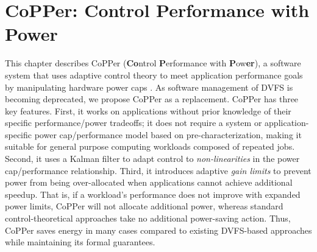 \chapter{CoPPer: Control Performance with Power}
\label{sec:copper}

This chapter describes CoPPer (\textbf{Co}ntrol \textbf{P}erf\-ormance with \textbf{P}ow\textbf{er}), a software system that uses adaptive control theory to meet application performance goals by manipulating hardware power caps \cite{CopperTR}.
As software management of DVFS is becoming deprecated, we propose CoPPer as a replacement.
CoPPer has three key features.
First, it works on applications without prior knowledge of their specific performance/power tradeoffs; \ie it does not require a system or application-specific power cap/performance model based on pre-characterization, making it suitable for general purpose computing workloads composed of repeated jobs.
Second, it uses a Kalman filter to adapt control to \emph{non-linearities} in the power cap/performance relationship.
Third, it introduces adaptive \emph{gain limits} to prevent power from being over-allocated when applications cannot achieve additional speedup.
That is, if a workload's performance does not improve with expanded power limits, CoPPer will not allocate additional power, whereas standard control-theoretical approaches take no additional power-saving action.
Thus, CoPPer saves energy in many cases compared to existing DVFS-based approaches while maintaining its formal guarantees.






